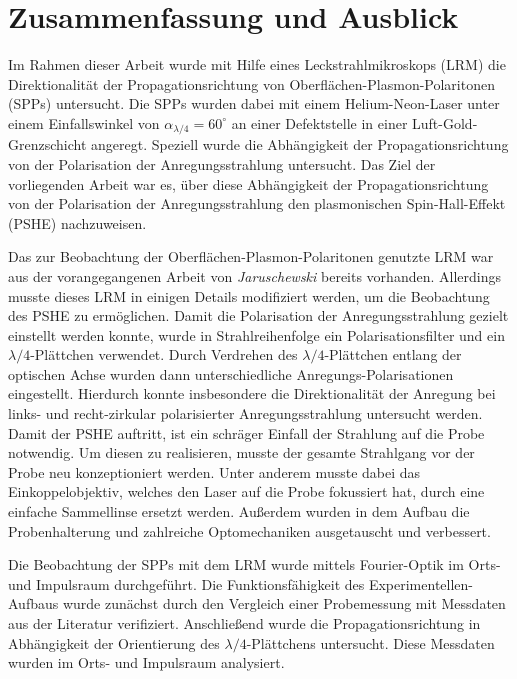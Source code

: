 \documentclass[a4paper, titlepage,  ngerman]{book}
\begin{document}
	\chapter{Zusammenfassung und Ausblick}
Im Rahmen dieser Arbeit wurde mit Hilfe eines Leckstrahlmikroskops (LRM) die Direktionalität der Propagationsrichtung von Oberflächen-Plasmon-Polaritonen (SPPs) untersucht. Die SPPs wurden dabei mit einem Helium-Neon-Laser unter einem Einfallswinkel von $\alpha_{\lambda/4}=60^\circ$ an einer Defektstelle in einer Luft-Gold-Grenzschicht angeregt. Speziell wurde die Abhängigkeit der Propagationsrichtung von der Polarisation der Anregungsstrahlung untersucht. Das Ziel der vorliegenden Arbeit war es, über diese Abhängigkeit der Propagationsrichtung von der Polarisation der Anregungsstrahlung den plasmonischen Spin-Hall-Effekt (PSHE) nachzuweisen.
	
	Das zur Beobachtung der Oberflächen-Plasmon-Polaritonen genutzte LRM war aus der vorangegangenen Arbeit \cite{Jaruschewski.2020} von  \textit{Jaruschewski} bereits vorhanden. Allerdings musste dieses LRM in einigen Details modifiziert werden, um die Beobachtung des PSHE zu ermöglichen. Damit die Polarisation der Anregungsstrahlung gezielt einstellt werden konnte, wurde in Strahlreihenfolge ein Polarisationsfilter und ein $\lambda/4$-Plättchen verwendet. Durch Verdrehen des $\lambda/4$-Plättchen entlang der optischen Achse wurden dann unterschiedliche Anregungs-Polarisationen eingestellt. Hierdurch konnte insbesondere die Direktionalität der Anregung bei links- und recht-zirkular polarisierter Anregungsstrahlung untersucht werden. Damit der PSHE auftritt, ist ein schräger Einfall der Strahlung auf die Probe notwendig. Um diesen zu realisieren, musste der gesamte Strahlgang vor der Probe neu konzeptioniert werden. Unter anderem musste dabei das Einkoppelobjektiv, welches den Laser auf die Probe fokussiert hat, durch eine einfache Sammellinse ersetzt werden. Außerdem wurden in dem Aufbau die Probenhalterung und zahlreiche Optomechaniken ausgetauscht und verbessert.
	
	Die Beobachtung der SPPs mit dem LRM wurde mittels Fourier-Optik im Orts- und Impulsraum durchgeführt. Die Funktionsfähigkeit des Experimentellen-Aufbaus wurde zunächst durch den Vergleich einer Probemessung mit Messdaten aus der Literatur verifiziert. Anschließend wurde die Propagationsrichtung in Abhängigkeit der Orientierung des $\lambda/4$-Plättchens untersucht. Diese Messdaten wurden im Orts- und Impulsraum analysiert.
	
\end{document}
